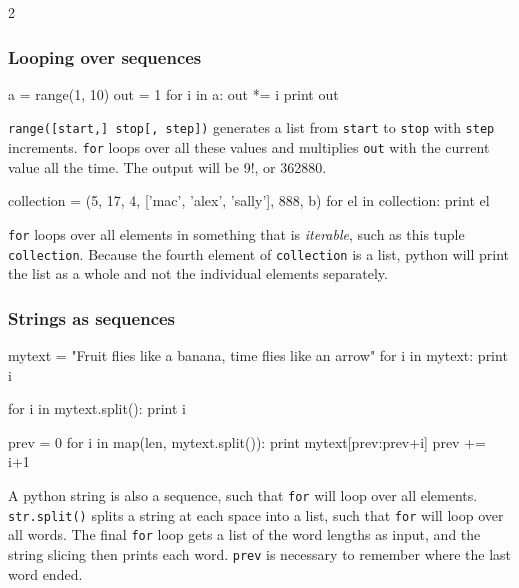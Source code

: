 \documentclass[draft=false]{article}
\newcommand{\answer}[1]{#1}%
\def\pythoni{\lstinline[language=pythontim]}
\begin{document}
\begin{multicols}{2}

\subsubsection{Looping over sequences}

\begin{python}
a = range(1, 10)
out = 1
for i in a:
	out *= i
print out
\end{python}

\answer{\pythoni{range([start,] stop[, step])} generates a list from \pythoni{start} to \pythoni{stop} with \pythoni{step} increments. \pythoni{for} loops over all these values and multiplies \pythoni{out} with the current value all the time. The output will be 9!, or 362880.}

\begin{python}
collection = (5, 17, 4, ['mac', 'alex', 'sally'], 888, b)
for el in collection:
	print el
\end{python}

\answer{\pythoni{for} loops over all elements in something that is \emph{iterable}, such as this tuple \pythoni{collection}. Because the fourth element of \pythoni{collection} is a list, python will print the list as a whole and not the individual elements separately.}

\columnbreak

\subsubsection{Strings as sequences}

\begin{python}
mytext = "Fruit flies like a banana, time flies like 
	an arrow"
for i in mytext:
	print i

for i in mytext.split():
	print i

prev = 0
for i in map(len, mytext.split()):
	print mytext[prev:prev+i]
	prev += i+1
\end{python}

\answer{A python string is also a sequence, such that \pythoni{for} will loop over all elements. \pythoni{str.split()} splits a string at each space into a list, such that \pythoni{for} will loop over all words. The final \pythoni{for} loop gets a list of the word lengths as input, and the string slicing then prints each word. \pythoni{prev} is necessary to remember where the last word ended.}

\end{multicols}
\end{document}
